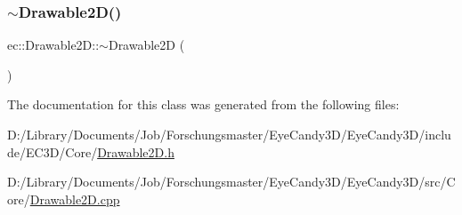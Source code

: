 \mbox{\label{classec_1_1_drawable2_d_a8a356c3fbf30122654e0c6f161dc8268}} 
\subsubsection{\texorpdfstring{$\sim$\+Drawable2\+D()}{~Drawable2D()}}
{\footnotesize\ttfamily ec\+::\+Drawable2\+D\+::$\sim$\+Drawable2D (\begin{DoxyParamCaption}{ }\end{DoxyParamCaption})\hspace{0.3cm}{\ttfamily [virtual]}}



The documentation for this class was generated from the following files\+:\begin{DoxyCompactItemize}
\item 
D\+:/\+Library/\+Documents/\+Job/\+Forschungsmaster/\+Eye\+Candy3\+D/\+Eye\+Candy3\+D/include/\+E\+C3\+D/\+Core/\mbox{\hyperlink{_drawable2_d_8h}{Drawable2\+D.\+h}}\item 
D\+:/\+Library/\+Documents/\+Job/\+Forschungsmaster/\+Eye\+Candy3\+D/\+Eye\+Candy3\+D/src/\+Core/\mbox{\hyperlink{_drawable2_d_8cpp}{Drawable2\+D.\+cpp}}\end{DoxyCompactItemize}
